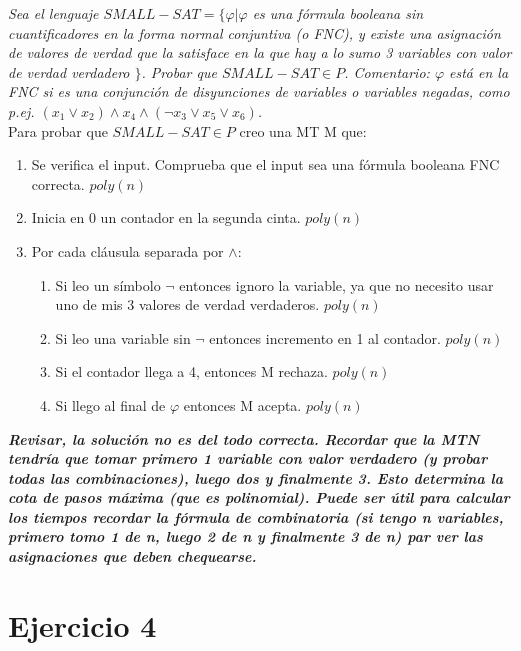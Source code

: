\documentclass[lnbip]{svmultln}
\begin{document}
\textit{Sea el lenguaje $SMALL-SAT = \{\varphi | \varphi$ es una fórmula booleana sin cuantificadores en la forma normal conjuntiva (o FNC), y existe una asignación de valores de verdad que la satisface en la que hay a lo sumo 3 variables con valor de verdad verdadero $\}$. Probar que $SMALL-SAT \in P$. Comentario: $\varphi$ está en la FNC si es una conjunción de disyunciones de variables o variables negadas, como p.ej. $(x_1 \lor x_{2}) \land {x_{4} \land (\neg x_3 \lor x_5 \lor x_{6})}$.} \\

Para probar que $SMALL-SAT \in P$ creo una MT M que:

\begin{enumerate}
    \item Se verifica el input. Comprueba que el input sea una fórmula booleana FNC correcta. $poly(n)$
    \item Inicia en 0 un contador en la segunda cinta. $poly(n)$
    \item Por cada cláusula separada por $\land$:
    
    \begin{enumerate}
        \item Si leo un símbolo $\neg$ entonces ignoro la variable, ya que no necesito usar uno de mis 3 valores de verdad verdaderos. $poly(n)$
        \item Si leo una variable sin $\neg$ entonces incremento en 1 al contador. $poly(n)$
        \item Si el contador llega a 4, entonces M rechaza. $poly(n)$
        \item Si llego al final de $\varphi$ entonces M acepta. $poly(n)$ \\
    \end{enumerate}
\end{enumerate}

\textbf{\textit{Revisar, la solución no es del todo correcta. Recordar que la MTN tendría que tomar primero 1 variable con valor verdadero (y probar todas las combinaciones), luego dos y finalmente 3. Esto determina la cota de pasos máxima (que es polinomial). Puede ser útil para calcular los tiempos recordar la fórmula de combinatoria (si tengo n variables, primero tomo 1 de n, luego 2 de n y finalmente 3 de n) par ver las asignaciones que deben chequearse.}} \\

\section{Ejercicio 4} 
\end{document}
